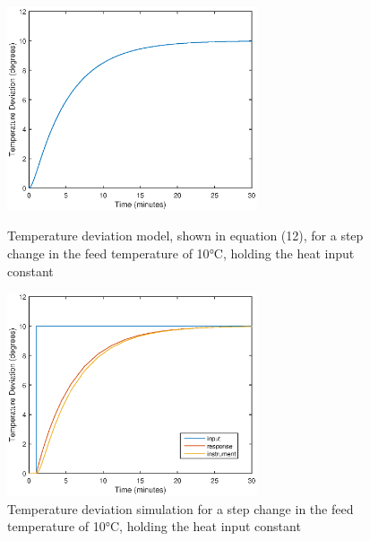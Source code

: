 \documentclass{article}
\begin{document}
\begin{figure}[h]
\begin{minipage}{0.45\textwidth}
\centering
\includegraphics[height=6cm]{2_mod}
\caption{Temperature deviation model, shown in equation (12), for a step change in the feed temperature of 10$\si{\degreeCelsius}$, holding the heat input constant}
\end{minipage}
\hspace{1cm}
\begin{minipage}{0.45\textwidth}
\centering
\includegraphics[height=6cm]{2_sim}
\caption{Temperature deviation simulation for a step change in the feed temperature of 10$\si{\degreeCelsius}$, holding the heat input constant}
\end{minipage}
\end{figure}

\end{document}
